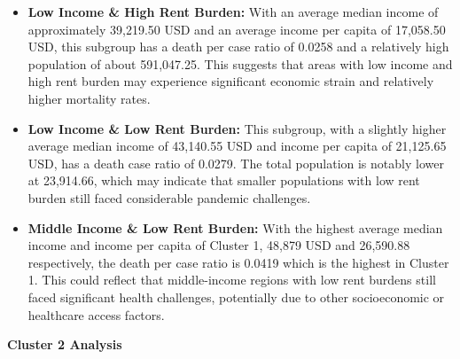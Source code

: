 \documentclass[
]{article}
\providecommand{\tightlist}{%
  \setlength{\itemsep}{0pt}\setlength{\parskip}{0pt}}
\begin{document}
\begin{itemize}
\tightlist
\item
  \textbf{Low Income \& High Rent Burden:} With an average median income
  of approximately 39,219.50 USD and an average income per capita of
  17,058.50 USD, this subgroup has a death per case ratio of 0.0258 and
  a relatively high population of about 591,047.25. This suggests that
  areas with low income and high rent burden may experience significant
  economic strain and relatively higher mortality rates.
\item
  \textbf{Low Income \& Low Rent Burden:} This subgroup, with a slightly
  higher average median income of 43,140.55 USD and income per capita of
  21,125.65 USD, has a death case ratio of 0.0279. The total population
  is notably lower at 23,914.66, which may indicate that smaller
  populations with low rent burden still faced considerable pandemic
  challenges.
\item
  \textbf{Middle Income \& Low Rent Burden:} With the highest average
  median income and income per capita of Cluster 1, 48,879 USD and
  26,590.88 respectively, the death per case ratio is 0.0419 which is
  the highest in Cluster 1. This could reflect that middle-income
  regions with low rent burdens still faced significant health
  challenges, potentially due to other socioeconomic or healthcare
  access factors.
\end{itemize}

\vspace{5pt}

\textbf{Cluster 2 Analysis}
\end{document}
